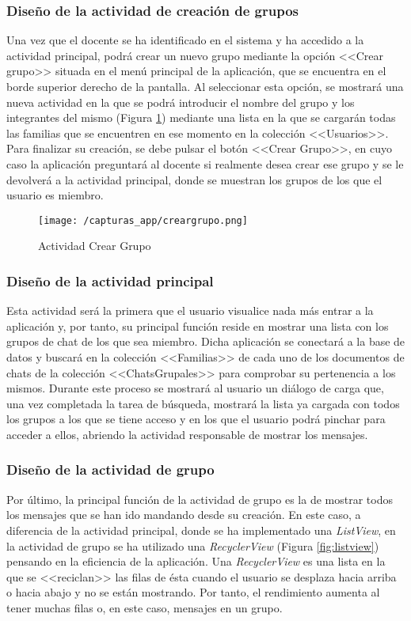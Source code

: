 \subsubsection{Diseño de la actividad de creación de grupos}
Una vez que el docente se ha identificado en el sistema y ha accedido a la actividad principal, podrá crear un nuevo grupo mediante la opción <<Crear grupo>> situada en el menú principal de la aplicación, que se encuentra en el borde superior derecho de la pantalla. Al seleccionar esta opción, se mostrará una nueva actividad en la que se podrá introducir el nombre del grupo y los integrantes del mismo (Figura \ref{fig:creargrupo}) mediante una lista en la que se cargarán todas las familias que se encuentren en ese momento en la colección <<Usuarios>>. Para finalizar su creación, se debe pulsar el botón <<Crear Grupo>>, en cuyo caso la aplicación preguntará al docente si realmente desea crear ese grupo y se le devolverá a la actividad principal, donde se muestran los grupos de los que el usuario es miembro.

\begin{figure}[!h]
	\begin{center}
		\texttt{[image: /capturas\_app/creargrupo.png]}
		\caption{Actividad Crear Grupo}
		\label{fig:creargrupo}
	\end{center}
\end{figure}

\newpage

\subsubsection{Diseño de la actividad principal}
Esta actividad será la primera que el usuario visualice nada más entrar a la aplicación y, por tanto, su principal función reside en mostrar una lista con los grupos de chat de los que sea miembro. Dicha aplicación se conectará a la base de datos y buscará en la colección <<Familias>> de cada uno de los documentos de chats de la colección <<ChatsGrupales>> para comprobar su pertenencia a los mismos. Durante este proceso se mostrará al usuario un diálogo de carga que, una vez completada la tarea de búsqueda, mostrará la lista ya cargada con todos los grupos a los que se tiene acceso y en los que el usuario podrá pinchar para acceder a ellos, abriendo la actividad responsable de mostrar los mensajes.

\subsubsection{Diseño de la actividad de grupo}
Por último, la principal función de la actividad de grupo es la de mostrar todos los mensajes que se han ido mandando desde su creación. En este caso, a diferencia de la actividad principal, donde se ha implementado una \textit{ListView}, en la actividad de grupo se ha utilizado una \textit{RecyclerView} (Figura \ref{fig:listview}) pensando en la eficiencia de la aplicación. Una \textit{RecyclerView} es una lista en la que se <<reciclan>> las filas de ésta cuando el usuario se desplaza hacia arriba o hacia abajo y no se están mostrando. Por tanto, el rendimiento aumenta al tener muchas filas o, en este caso, mensajes en un grupo.

